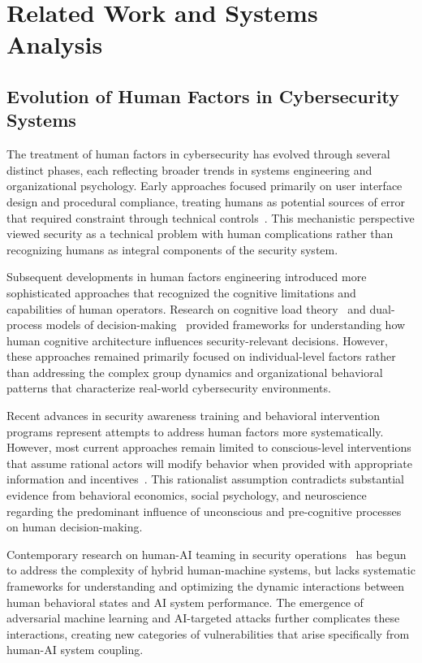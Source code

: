 \documentclass[journal]{IEEEtran}
\begin{document}
\section{Related Work and Systems Analysis}

\subsection{Evolution of Human Factors in Cybersecurity Systems}

The treatment of human factors in cybersecurity has evolved through several distinct phases, each reflecting broader trends in systems engineering and organizational psychology. Early approaches focused primarily on user interface design and procedural compliance, treating humans as potential sources of error that required constraint through technical controls~\cite{anderson2001}. This mechanistic perspective viewed security as a technical problem with human complications rather than recognizing humans as integral components of the security system.

Subsequent developments in human factors engineering introduced more sophisticated approaches that recognized the cognitive limitations and capabilities of human operators. Research on cognitive load theory~\cite{miller1956} and dual-process models of decision-making~\cite{kahneman2011} provided frameworks for understanding how human cognitive architecture influences security-relevant decisions. However, these approaches remained primarily focused on individual-level factors rather than addressing the complex group dynamics and organizational behavioral patterns that characterize real-world cybersecurity environments.

Recent advances in security awareness training and behavioral intervention programs represent attempts to address human factors more systematically. However, most current approaches remain limited to conscious-level interventions that assume rational actors will modify behavior when provided with appropriate information and incentives~\cite{beautement2008}. This rationalist assumption contradicts substantial evidence from behavioral economics, social psychology, and neuroscience regarding the predominant influence of unconscious and pre-cognitive processes on human decision-making.

Contemporary research on human-AI teaming in security operations~\cite{mcneese2021} has begun to address the complexity of hybrid human-machine systems, but lacks systematic frameworks for understanding and optimizing the dynamic interactions between human behavioral states and AI system performance. The emergence of adversarial machine learning and AI-targeted attacks further complicates these interactions, creating new categories of vulnerabilities that arise specifically from human-AI system coupling.
\end{document}
